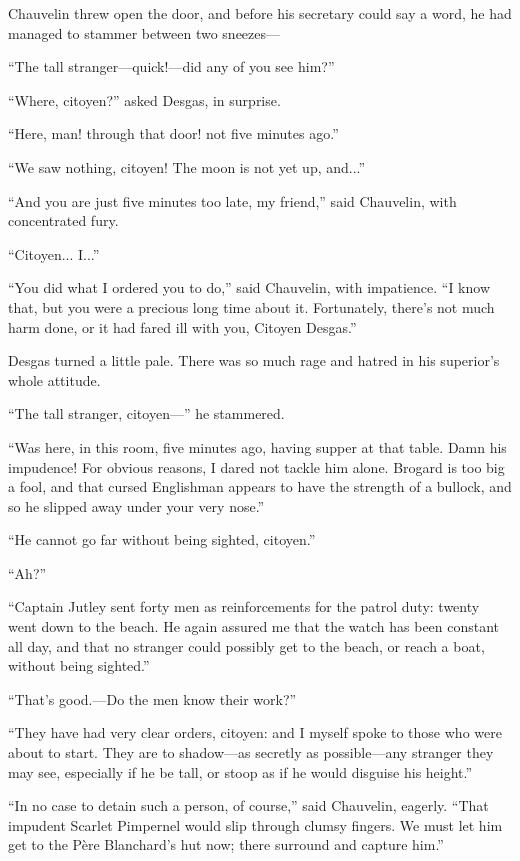 \documentclass[paper=5.5in:8.5in,BCOR=7mm,twoside,DIV=calc,12pt,usegeometry,chapterprefix,endperiod,headings=big]{scrbook}
\begin{document}
Chauvelin threw open the door, and before his secretary could say a word, he had managed to stammer between two sneezes---

\enquote{The tall stranger---quick!---did any of you see him?}

\enquote{Where, citoyen?} asked Desgas, in surprise.

\enquote{Here, man! through that door! not five minutes ago.}

\enquote{We saw nothing, citoyen! The moon is not yet up, and...}

\enquote{And you are just five minutes too late, my friend,} said Chauvelin, with concentrated fury.

\enquote{Citoyen... I...}

\enquote{You did what I ordered you to do,} said Chauvelin, with impatience. \enquote{I know that, but you were a precious long time about it. Fortunately, there's not much harm done, or it had fared ill with you, Citoyen Desgas.}

Desgas turned a little pale. There was so much rage and hatred in his superior's whole attitude.

\enquote{The tall stranger, citoyen---} he stammered.

\enquote{Was here, in this room, five minutes ago, having supper at that table. Damn his impudence! For obvious reasons, I dared not tackle him alone. Brogard is too big a fool, and that cursed Englishman appears to have the strength of a bullock, and so he slipped away under your very nose.}

\enquote{He cannot go far without being sighted, citoyen.}

\enquote{Ah?}

\enquote{Captain Jutley sent forty men as reinforcements for the patrol duty: twenty went down to the beach. He again assured me that the watch has been constant all day, and that no stranger could possibly get to the beach, or reach a boat, without being sighted.}

\enquote{That's good.---Do the men know their work?}

\enquote{They have had very clear orders, citoyen: and I myself spoke to those who were about to start. They are to shadow---as secretly as possible---any stranger they may see, especially if he be tall, or stoop as if he would disguise his height.}

\enquote{In no case to detain such a person, of course,} said Chauvelin, eagerly. \enquote{That impudent Scarlet Pimpernel would slip through clumsy fingers. We must let him get to the Père Blanchard's hut now; there surround and capture him.}
\end{document}
